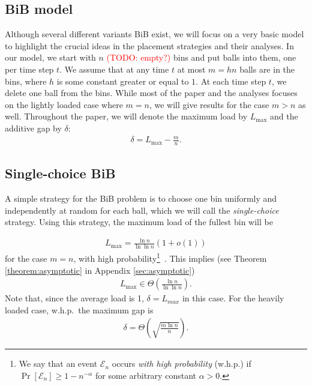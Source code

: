 \documentclass[a4paper,12pt]{article}
\newcommand\todo[1]{\textcolor{red}{(TODO: #1)}}
\newcommand\load{L_{\mathrm{max}}}
\begin{document}
\subsection{BiB model}
\label{sec:model}
Although several different variants BiB exist, we will focus on a very basic model to highlight the crucial ideas in the placement strategies and their analyses. In our model, we start with $n$ \todo{empty?}  bins and put balls into them, one per time step $t$. We assume that at any time $t$ at most $m = h n$ balls are in the bins, where $h$ is some constant greater or equal to $1$. At each time step $t$, we delete one ball from the bins. While most of the paper and the analyses focuses on the lightly loaded case where $m=n$, we will give results for the case $m > n$ as well. Throughout the paper, we will denote the maximum load by $\load$ and the additive gap by $\delta$:
\begin{align*}
\delta = \load - \frac{m}{n}.
\end{align*}

\subsection{Single-choice BiB}
\label{sec:single-choice}
A simple strategy for the BiB problem is to choose one bin uniformly and independently at random for each ball, which we will call the \emph{single-choice} strategy. Using this strategy, the maximum load of the fullest bin will be
\begin{comment}
\footnote{A more accurate result exists: The maximum load is $\load = \Gamma^{-1}\left(n\right)\left(1+O\left(\frac{1}{\log \Gamma^{-1}\left(n\right)}\right)\right)$ \cite{G91}.}
\end{comment}
\begin{align*}
\load = \frac{\ln n}{\ln \ln n}  \left(1 + o\left(1\right)\right)
\end{align*}
for the case $m=n$, with high probability\footnote{We say that an event $\mathcal E_n$ occurs \emph{with high probability} (w.h.p.) if $\Pr\left[\mathcal E_n \right] \geq 1 - n^{-\alpha}$ for some arbitrary constant $\alpha > 0$.}~\cite{RS98}. This implies (see Theorem \ref{theorem:asymptotic} in Appendix \ref{sec:asymptotic})
\begin{align*}
\load\in \Theta\left(\frac{\ln n}{\ln \ln n}\right).
\end{align*}
Note that, since the average load is 1, $\delta = L_{max}$ in this case. For the heavily loaded case, w.h.p.~the maximum gap is ~\cite{RS98}
\begin{align*}
\delta = \Theta\left(\sqrt{\frac{m  \ln n}{n}}\right).
\end{align*}
\end{document}
